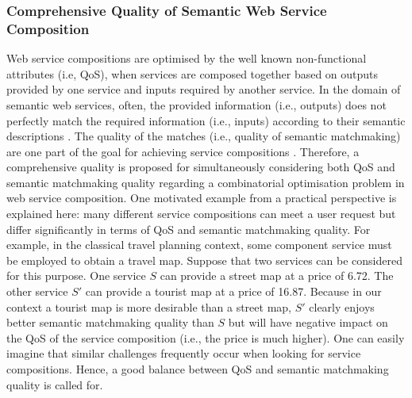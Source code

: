 \subsubsection{Comprehensive Quality of Semantic Web Service Composition}\label{SC:hybridisation}
Web service compositions are optimised by the well known non-functional attributes (i.e, QoS), when services are composed together based on outputs provided by one service and inputs required by another service. In the domain of semantic web services, often, the provided information (i.e., outputs) does not perfectly match the required information (i.e., inputs) according to their semantic descriptions \cite{lecue2008optimizing}. The quality of the matches (i.e., quality of semantic matchmaking) are one part of the goal for achieving service compositions \cite{lecue2009optimizing}. Therefore, a comprehensive quality is proposed for simultaneously considering both QoS and semantic matchmaking quality regarding a combinatorial optimisation problem in web service composition. One motivated example from a practical perspective is explained here: many different service compositions can meet a user request but differ significantly in terms of QoS and semantic matchmaking quality. For example, in the classical travel planning context, some component service must be employed to obtain a travel map. Suppose that two services can be considered for this purpose. One service $S$ can provide a street map at a price of 6.72. The other service $S'$ can provide a tourist map at a price of 16.87. Because in our context a tourist map is more desirable than a street map, $S'$ clearly enjoys better semantic matchmaking quality than $S$ but will have negative impact on the QoS of the service composition (i.e., the price is much higher). One can easily imagine that similar challenges frequently occur when looking for service compositions. Hence, a good balance between QoS and semantic matchmaking quality is called for.


